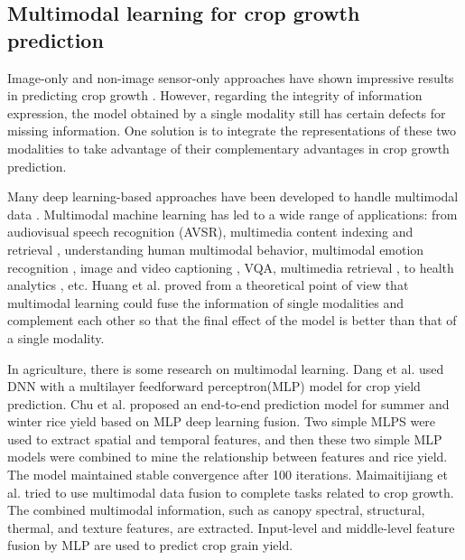 \documentclass[acmsmall,manuscript, screen, review]{acmart}
\begin{document}
\subsection{Multimodal learning for crop growth prediction}
Image-only and non-image sensor-only approaches have shown impressive results in predicting crop growth \cite{padilla_proximal_2018}. However, regarding the integrity of information expression, the model obtained by a single modality still has certain defects for missing information. One solution is to integrate the representations of these two modalities to take advantage of their complementary advantages in crop growth prediction. 

Many deep learning-based approaches have been developed to handle multimodal data \cite{sengupta_review_2020}. Multimodal machine learning has led to a wide range of applications: from audiovisual speech recognition (AVSR)\cite{yuhas_integration_1989}, multimedia content indexing and retrieval \cite{snoek_multimodal_2005}, understanding human multimodal behavior, multimodal emotion recognition \cite{chen_heu_2021}, image and video captioning \cite{lei_video_2021}, VQA\cite{long_improving_2021}, multimedia retrieval \cite{souza_online_2021}, to health analytics \cite{yazdavar_multimodal_2020}, etc. Huang et al. \cite{huang_what_2021} proved from a theoretical point of view that multimodal learning could fuse the information of single modalities and complement each other so that the final effect of the model is better than that of a single modality.

In agriculture, there is some research on multimodal learning. Dang et al. \cite{dang2021autumn} used DNN with a multilayer feedforward perceptron(MLP) model for crop yield prediction. Chu et al. \cite{chu_end--end_2020} proposed an end-to-end prediction model for summer and winter rice yield based on MLP deep learning fusion. Two simple MLPS were used to extract spatial and temporal features, and then these two simple MLP models were combined to mine the relationship between features and rice yield. The model maintained stable convergence after 100 iterations. Maimaitijiang et al. \cite{maimaitijiang_soybean_2020} tried to use multimodal data fusion to complete tasks related to crop growth. The combined multimodal information, such as canopy spectral, structural, thermal, and texture features, are extracted. Input-level and middle-level feature fusion by MLP are used to predict crop grain yield. 
\end{document}
